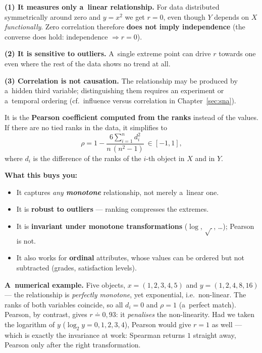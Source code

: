 \documentclass[11pt,a4paper]{article}
\theoremstyle{definition}
\begin{document}
\begin{poznbox}
\textbf{(1) It measures only a~linear relationship.} For data distributed symmetrically around
zero and $y=x^2$ we get $r=0$, even though $Y$ depends on $X$ \emph{functionally}. Zero
correlation therefore \textbf{does not imply independence} (the converse does hold:
independence $\Rightarrow r=0$).

\textbf{(2) It is sensitive to outliers.} A~single extreme point can drive $r$ towards one even
where the rest of the data shows no trend at all.

\textbf{(3) Correlation is not causation.} The relationship may be produced by a~hidden third
variable; distinguishing them requires an experiment or a~temporal ordering (cf.\ influence
versus correlation in Chapter~\ref{sec:sna}).
\end{poznbox}

\begin{defbox}
It is the \textbf{Pearson coefficient computed from the ranks} instead of the values. If there
are no tied ranks in the data, it simplifies to
\[ \rho = 1-\frac{6\sum_{i=1}^{n} d_i^2}{n\,(n^2-1)}\ \in[-1,1], \]
where $d_i$ is the difference of the ranks of the $i$-th object in $X$ and in $Y$.

\textbf{What this buys you:}
\begin{itemize}
\item It captures \emph{any \textbf{monotone}} relationship, not merely a~linear one.
\item It is \textbf{robust to outliers} --- ranking compresses the extremes.
\item It is \textbf{invariant under monotone transformations} ($\log$, $\sqrt{\ }$, \dots);
      Pearson is not.
\item It also works for \textbf{ordinal} attributes, whose values can be ordered but not
      subtracted (grades, satisfaction levels).
\end{itemize}
\end{defbox}

\textbf{A~numerical example.} Five objects, $x=(1,2,3,4,5)$ and $y=(1,2,4,8,16)$ --- the
relationship is \emph{perfectly monotone}, yet exponential, i.e.\ non-linear. The ranks of both
variables coincide, so all $d_i=0$ and $\rho=1$ (a~perfect match). Pearson, by contrast, gives
$r\doteq 0{,}93$: it \emph{penalises} the non-linearity. Had we taken the logarithm of $y$
($\log_2 y = 0,1,2,3,4$), Pearson would give $r=1$ as well --- which is exactly the invariance
at work: Spearman returns $1$ straight away, Pearson only after the right transformation.
\end{document}

